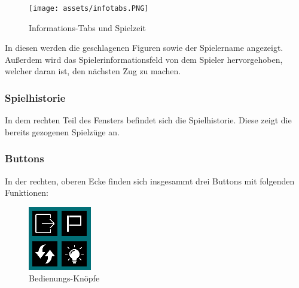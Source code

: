 \documentclass[a4paper, 10pt]{scrartcl}
\begin{document}
\begin{figure}[h]
        \centering
        \texttt{[image: assets/infotabs.PNG]}
        \caption{Informations-Tabs und Spielzeit}
\end{figure}
In diesen werden die geschlagenen Figuren sowie der Spielername angezeigt. Außerdem wird das Spielerinformationsfeld von dem Spieler hervorgehoben, welcher daran ist, den
nächsten Zug zu machen.

\subsubsection{Spielhistorie}

In dem rechten Teil des Fensters befindet sich die Spielhistorie. Diese zeigt die bereits gezogenen Spielzüge an. 

\subsubsection{Buttons}
In der rechten, oberen Ecke finden sich insgesammt drei Buttons mit folgenden Funktionen:
\begin{figure}
        \centering
        \includegraphics{assets/Buttons.PNG}
        \caption{Bedienungs-Knöpfe}
\end{figure}
\end{document}
